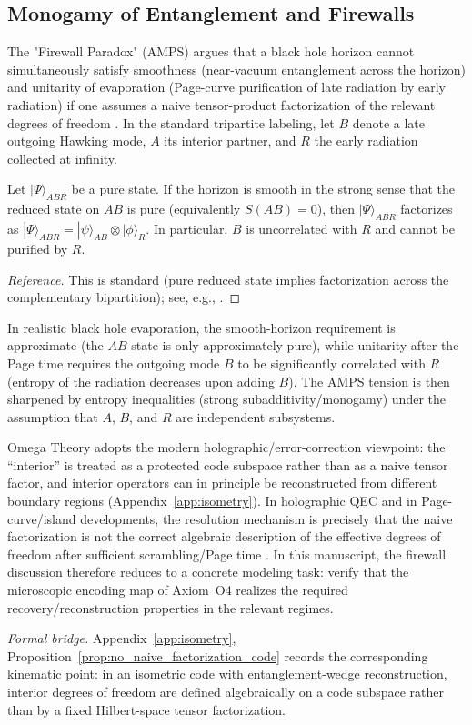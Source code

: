 \subsection{Monogamy of Entanglement and Firewalls}
The "Firewall Paradox" (AMPS) argues that a black hole horizon cannot simultaneously satisfy smoothness (near-vacuum entanglement across the horizon) and unitarity of evaporation (Page-curve purification of late radiation by early radiation) if one assumes a naive tensor-product factorization of the relevant degrees of freedom \cite{AlmheiriMarolfPolchinskiSully2013}. In the standard tripartite labeling, let $B$ denote a late outgoing Hawking mode, $A$ its interior partner, and $R$ the early radiation collected at infinity.
\begin{proposition}
\label{prop:amps_monogamy}
Let $|\Psi\rangle_{ABR}$ be a pure state. If the horizon is smooth in the strong sense that the reduced state on $AB$ is pure (equivalently $S(AB)=0$), then $|\Psi\rangle_{ABR}$ factorizes as $|\Psi\rangle_{ABR}=|\psi\rangle_{AB}\otimes|\phi\rangle_{R}$. In particular, $B$ is uncorrelated with $R$ and cannot be purified by $R$.
\end{proposition}
\begin{proof}[Reference]
This is standard (pure reduced state implies factorization across the complementary bipartition); see, e.g., \cite{NielsenChuang2000}.
\end{proof}
\noindent
In realistic black hole evaporation, the smooth-horizon requirement is approximate (the $AB$ state is only approximately pure), while unitarity after the Page time requires the outgoing mode $B$ to be significantly correlated with $R$ (entropy of the radiation decreases upon adding $B$). The AMPS tension is then sharpened by entropy inequalities (strong subadditivity/monogamy) under the assumption that $A$, $B$, and $R$ are independent subsystems.

Omega Theory adopts the modern holographic/error-correction viewpoint: the ``interior'' is treated as a protected code subspace rather than as a naive tensor factor, and interior operators can in principle be reconstructed from different boundary regions (Appendix~\ref{app:isometry}). In holographic QEC and in Page-curve/island developments, the resolution mechanism is precisely that the naive factorization is not the correct algebraic description of the effective degrees of freedom after sufficient scrambling/Page time \cite{AlmheiriDongHarlow2015,Pastawski2015,Harlow2017,Penington2020,Almheiri2019,Harlow2021}. In this manuscript, the firewall discussion therefore reduces to a concrete modeling task: verify that the microscopic encoding map of Axiom~O4 realizes the required recovery/reconstruction properties in the relevant regimes.
\par\noindent
\textit{Formal bridge.} Appendix~\ref{app:isometry}, Proposition~\ref{prop:no_naive_factorization_code} records the corresponding kinematic point: in an isometric code with entanglement-wedge reconstruction, interior degrees of freedom are defined algebraically on a code subspace rather than by a fixed Hilbert-space tensor factorization.

